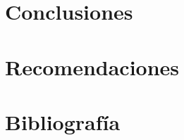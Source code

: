 \documentclass[twocolumn]{article}
\begin{document}
\section{Conclusiones}



\section{Recomendaciones}



\section{Bibliografía}
\end{document}
